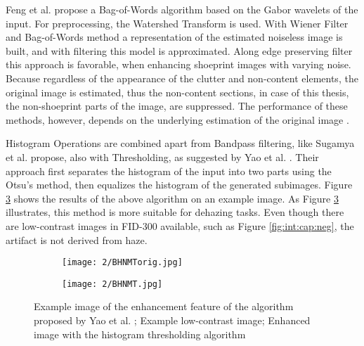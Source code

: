 \documentclass[draft,final]{vutinfth} %
\begin{document}
Feng et al. \cite{feng2011bag} propose a Bag-of-Words algorithm based on the Gabor wavelets of the input. 
For preprocessing, the Watershed Transform is used.
With Wiener Filter and Bag-of-Words method a representation of the estimated noiseless image is built, and with filtering this model is approximated.
Along edge preserving filter this approach is favorable, when enhancing shoeprint images with varying noise.
Because regardless of the appearance of the clutter and non-content elements, the original image is estimated, thus the non-content sections, in case of this thesis, the non-shoeprint parts of the image, are suppressed.
The performance of these methods, however, depends on the underlying estimation of the original image \cite{li2014rapid}.
\par
Histogram Operations are combined apart from Bandpass filtering, like Sugamya et al. \cite{sugamya2016image} propose, also with Thresholding, as suggested by Yao et al. \cite{yao2016image}. 
Their approach first separates the histogram of the input into two parts using the Otsu's method, then equalizes the histogram of the generated subimages. 
Figure \ref{fig:rw:BHNMT} shows the results of the above algorithm on an example image.
As Figure \ref{fig:rw:BHNMT} illustrates, this method is more suitable for dehazing tasks. 
Even though there are low-contrast images in FID-300 available, such as Figure \ref{fig:int:cap:neg}, the artifact is not derived from haze. 

\begin{figure}[h]
  \centering
  \begin{subfigure}[t]{0.4\columnwidth}
    \centering
    \texttt{[image: 2/BHNMTorig.jpg]}
    \subcaption{}
    \label{fig:rw:BHNMTin}
  \end{subfigure}
  \begin{subfigure}[t]{0.4\columnwidth}
    \centering
    \texttt{[image: 2/BHNMT.jpg]}
    \subcaption{}
    \label{fig:rw:BHNMTout}
  \end{subfigure}
  \caption{Example image of the enhancement feature of the algorithm proposed by Yao et al. \cite{yao2016image};
			 Example low-contrast image;  Enhanced image with the histogram thresholding algorithm}
  \label{fig:rw:BHNMT} %
\end{figure}
\end{document}
